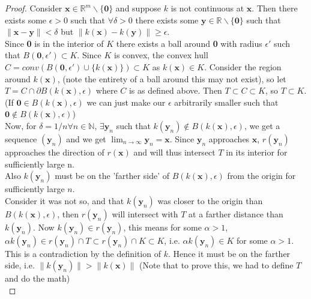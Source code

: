 \documentclass{article}
\theoremstyle{definition}
\begin{document}
\begin{proof}
Consider $\mathbf{x} \in \mathbb{R}^m\backslash \{\mathbf{0}\}$ and suppose $k$ is not continuous at $\mathbf{x}$. Then there exists some $\epsilon > 0 $ such that $\forall \delta>0$ there exists some $\mathbf{y}\in \mathbb{R}\backslash \{\mathbf{0}\}$ such that $\| \mathbf{x} - \mathbf{y}\| < \delta$ but $\|k(\mathbf{x}) - k(\mathbf{y})\| \geq \epsilon$.\\
Since \textbf{0} is in the interior of $K$ there exists a ball around \textbf{0} with radius $\epsilon'$ such that $B(\mathbf{0}, \epsilon')\subset K$. Since $K$ is convex, the convex hull $C = conv(B(\mathbf{0}, \epsilon')\cup \{k(\mathbf{x})\}) \subset K$ as $k(\mathbf{x}) \in K$. Consider the region around $k(\mathbf{x})$, (note the entirety of a ball around this may not exist), so let $T = C\cap \partial B(k(\mathbf{x}), \epsilon)$ where $C$ is as defined above. Then $T\subset C\subset K$, so $T\subset K$. (If $\mathbf{0}\in B(k(\mathbf{x}), \epsilon)$ we can just make our $\epsilon$ arbitrarily smaller such that $\mathbf{0}\notin B(k(\mathbf{x}), \epsilon)$)\\

Now, for $\delta = 1/n \forall n \in \mathbb{N}$, $\exists \mathbf{y}_n$ such that $k(\mathbf{y}_n) \notin B(k(\mathbf{x}), \epsilon)$, we get a sequence $(\mathbf{y}_n)$ and we get $\lim_{n\to \infty} \mathbf{y}_n = \mathbf{x}$. Since $\mathbf{y}_n$ approaches $\mathbf{x}$, $r(\mathbf{y}_n)$ approaches the direction of $r(\mathbf{x})$ and will thus intersect $T$ in its interior for sufficiently large n.\\

Also $k(\mathbf{y}_n)$ must be on the 'farther side' of $B(k(\mathbf{x}), \epsilon)$ from the origin for sufficiently large $n$.\\
Consider it was not so, and that $k(\mathbf{y}_n)$ was closer to the origin than $B(k(\mathbf{x}), \epsilon)$, then $r(\mathbf{y}_n)$ will intersect with $T$ at a farther distance than $k(\mathbf{y}_n)$. Now $k(\mathbf{y}_n) \in r(\mathbf{y}_n)$, this means for some $\alpha>1$, $\alpha k(\mathbf{y}_n) \in r(\mathbf{y}_n) \cap T \subset r(\mathbf{y}_n) \cap K \subset K$, i.e. $\alpha k(\mathbf{y}_n) \in K$ for some $\alpha>1$. This is a contradiction by the definition of $k$. Hence it must be on the farther side, i.e. $\|k(\mathbf{y}_n)\|> \|k(\mathbf{x})\|$ (Note that to prove this, we had to define $T$ and do the math)\\


\end{proof}
\end{document}
